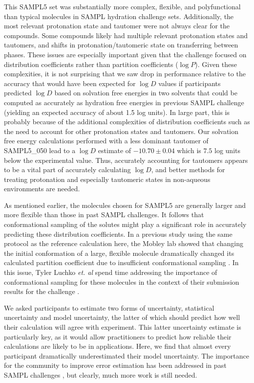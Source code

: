 This SAMPL5 set was substantially more complex, flexible, and polyfunctional than typical molecules in SAMPL hydration challenge sets. 
Additionally, the most relevant protonation state and tautomer were not always clear for the compounds.
Some compounds likely had multiple relevant protonation states and tautomers, and shifts in protonation/tautomeric state on transferring between phases.
These issues are especially important given that the challenge focused on distribution coefficients rather than partition coefficients ($\log P$).
Given these complexities, it is not surprising that we saw drop in performance relative to the accuracy that would have been expected for $\log D$ values if participants predicted $\log D$ based on solvation free energies in two solvents that could be computed as accurately as hydration free energies in previous SAMPL challenge (yielding an expected accuracy of about 1.5 log units). 
In large part, this is probably because of the additional complexities of distribution coefficients such as the need to account for other protonation states and tautomers. 
Our solvation free energy calculations performed with a less dominant tautomer of SAMPL5\_050 lead to a $\log D$ estimate of $-10.70 \pm 0.04$ which is $7.5$ log units below the experimental value. 
Thus, accurately accounting for tautomers appears to be a vital part of accurately calculating $\log D$, and better methods for treating protonation and especially tautomeric states in non-aqueous environments are needed.

As mentioned earlier, the molecules chosen for SAMPL5 are generally larger and more flexible than those in past SAMPL challenges. 
It follows that conformational sampling of the solutes might play a significant role in accurately predicting these distribution coefficients. 
In a previous study using the same protocol as the reference calculation here, the Mobley lab showed that changing the initial conformation of a large, flexible molecule dramatically changed its calculated partition coefficient due to insufficient conformational sampling \cite{Bannan:2016lp}.
In this issue, Tyler Luchko \emph{et. al} spend time addressing the importance of conformational sampling for these molecules in the context of their submission results for the  challenge \cite{Luchko:sampl5}. 

We asked participants to estimate two forms of uncertainty, statistical uncertainty and model uncertainty, the latter of which should predict how well their calculation will agree with experiment. 
This latter uncertainty estimate is particularly key, as it would allow practitioners to predict how reliable their calculations are likely to be in applications. 
Here, we find that almost every participant dramatically underestimated their model uncertainty. 
The importance for the community to improve error estimation has been addressed in past SAMPL challenges  \cite{Mobley:2014gu}, but clearly, much more work is still needed.


